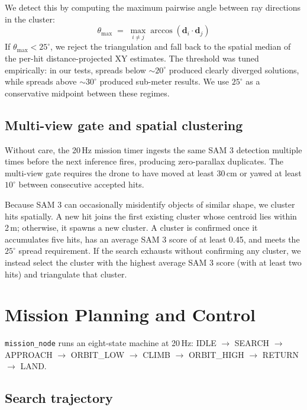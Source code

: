 \documentclass[conference]{IEEEtran}
\begin{document}
We detect this by computing the maximum pairwise angle between
ray directions in the cluster:
\begin{equation}
\theta_{\max} \;=\; \max_{i \ne j}
\arccos(\mathbf{d}_i \cdot \mathbf{d}_j)
\label{eq:spread}
\end{equation}
If $\theta_{\max} < 25^{\circ}$, we reject the triangulation and
fall back to the spatial median of the per-hit
distance-projected XY estimates. The threshold was tuned
empirically: in our tests, spreads below $\sim 20^{\circ}$ produced
clearly diverged solutions, while spreads above $\sim 30^{\circ}$
produced sub-meter results. We use $25^{\circ}$ as a conservative
midpoint between these regimes.

\subsection{Multi-view gate and spatial clustering}

Without care, the 20\,Hz mission timer ingests the same SAM 3
detection multiple times before the next inference fires, producing
zero-parallax duplicates. The multi-view gate requires the drone
to have moved at least 30\,cm or yawed at least $10^{\circ}$
between consecutive accepted hits.

Because SAM 3 can occasionally misidentify objects of similar shape,
we cluster hits spatially. A new hit joins the first existing
cluster whose centroid lies within 2\,m; otherwise, it spawns a
new cluster. A cluster is confirmed once it accumulates five hits,
has an average SAM 3 score of at least 0.45, and meets the
$25^{\circ}$ spread requirement. If the search exhausts without
confirming any cluster, we instead select the cluster with the
highest average SAM 3 score (with at least two hits) and triangulate
that cluster.

\section{Mission Planning and Control}
\label{sec:mission}

\texttt{mission\_node} runs an eight-state machine at 20\,Hz:
IDLE $\rightarrow$ SEARCH $\rightarrow$ APPROACH $\rightarrow$
ORBIT\_LOW $\rightarrow$ CLIMB $\rightarrow$ ORBIT\_HIGH $\rightarrow$
RETURN $\rightarrow$ LAND.

\subsection{Search trajectory}
\end{document}
